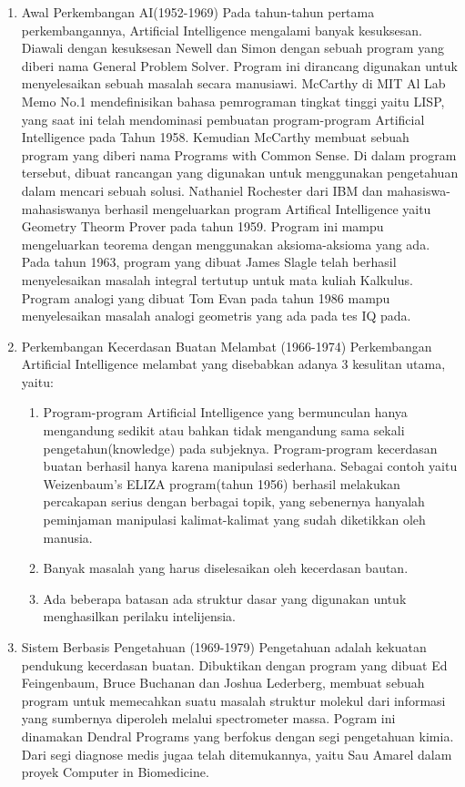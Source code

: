 \begin{enumerate}
\begin{enumerate}
\item Awal Perkembangan AI(1952-1969)
\hfill\break
Pada tahun-tahun pertama perkembangannya, Artificial Intelligence mengalami banyak kesuksesan. Diawali dengan kesuksesan Newell dan Simon dengan sebuah program yang diberi nama General Problem Solver. Program ini dirancang digunakan untuk menyelesaikan sebuah masalah secara manusiawi.
\hfill\break
McCarthy di MIT Al Lab Memo No.1 mendefinisikan bahasa pemrograman tingkat tinggi yaitu LISP, yang saat ini telah mendominasi pembuatan program-program Artificial Intelligence pada Tahun 1958. Kemudian McCarthy membuat sebuah program yang diberi nama Programs with Common Sense. Di dalam program tersebut, dibuat rancangan yang digunakan untuk menggunakan pengetahuan dalam mencari sebuah solusi. 
\hfill\break
Nathaniel Rochester dari IBM dan mahasiswa-mahasiswanya berhasil mengeluarkan program Artifical Intelligence yaitu Geometry Theorm Prover pada tahun 1959. Program ini mampu mengeluarkan teorema dengan menggunakan aksioma-aksioma yang ada.
\hfill\break
Pada tahun 1963, program yang dibuat James Slagle telah berhasil menyelesaikan masalah integral tertutup untuk mata kuliah Kalkulus.
\hfill\break
Program analogi yang dibuat Tom Evan pada tahun 1986 mampu menyelesaikan masalah analogi geometris yang ada pada tes IQ pada.
\item Perkembangan Kecerdasan Buatan Melambat (1966-1974)
\hfill\break
Perkembangan Artificial Intelligence melambat yang disebabkan adanya 3 kesulitan utama, yaitu:
\begin{enumerate}
\item Program-program Artificial Intelligence yang bermunculan hanya mengandung sedikit atau bahkan tidak mengandung sama sekali pengetahun(knowledge) pada subjeknya. Program-program kecerdasan buatan berhasil hanya karena manipulasi sederhana. Sebagai contoh yaitu Weizenbaum's ELIZA program(tahun 1956) berhasil melakukan percakapan serius dengan berbagai topik, yang sebenernya hanyalah peminjaman manipulasi kalimat-kalimat yang sudah diketikkan oleh manusia.
\item Banyak masalah yang harus diselesaikan oleh kecerdasan bautan.
\item Ada beberapa batasan ada struktur dasar yang digunakan untuk menghasilkan perilaku intelijensia.
\end{enumerate}
\item Sistem Berbasis Pengetahuan (1969-1979)
\hfill\break
Pengetahuan adalah kekuatan pendukung kecerdasan buatan. Dibuktikan dengan program yang dibuat  Ed Feingenbaum, Bruce Buchanan dan Joshua Lederberg, membuat sebuah program untuk memecahkan suatu masalah struktur molekul dari informasi yang sumbernya diperoleh melalui spectrometer massa. Pogram ini dinamakan Dendral Programs yang berfokus dengan segi pengetahuan kimia. Dari segi diagnose medis jugaa telah ditemukannya, yaitu Sau Amarel dalam proyek Computer in Biomedicine.

\end{enumerate}
\end{enumerate}
